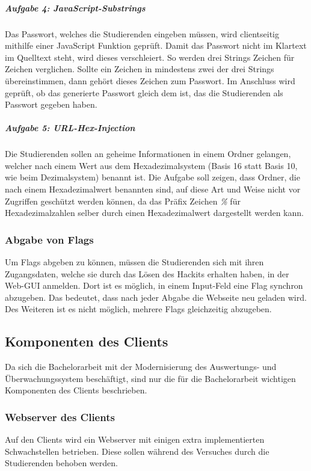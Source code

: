 \subparagraph{Aufgabe 4: JavaScript-Substrings}\label{subpara:Aufgabe_4_JavaScript-Substrings}
Das Passwort, welches die Studierenden eingeben müssen, wird clientseitig mithilfe einer JavaScript Funktion geprüft. Damit das Passwort nicht im Klartext im Quelltext steht, wird dieses verschleiert. So werden drei Strings Zeichen für Zeichen verglichen. Sollte ein Zeichen in mindestens zwei der drei Strings übereinstimmen, dann gehört dieses Zeichen zum Passwort. Im Anschluss wird geprüft, ob das generierte Passwort gleich dem ist, das die Studierenden als Passwort gegeben haben.

\subparagraph{Aufgabe 5: URL-Hex-Injection}\label{subpara:Aufgabe_5_URL-Hex-Injection}
Die Studierenden sollen an geheime Informationen in einem Ordner gelangen, welcher nach einem Wert aus dem Hexadezimalsystem (Basis 16 statt Basis 10, wie beim Dezimalsystem) benannt ist. Die Aufgabe soll zeigen, dass Ordner, die nach einem Hexadezimalwert benannten sind, auf diese Art und Weise nicht vor Zugriffen geschützt werden können, da das Präfix Zeichen \textit{\%} für Hexadezimalzahlen selber durch einen Hexadezimalwert dargestellt werden kann.

\subsubsection{Abgabe von Flags}\label{subsubsec:Abgabe_von_Flags}
Um Flags abgeben zu können, müssen die Studierenden sich mit ihren Zugangsdaten, welche sie durch das Lösen des Hackits erhalten haben, in der Web-GUI anmelden. Dort ist es möglich, in einem Input-Feld eine Flag synchron abzugeben. Das bedeutet, dass nach jeder Abgabe die Webseite neu geladen wird. Des Weiteren ist es nicht möglich, mehrere Flags gleichzeitig abzugeben.

\subsection{Komponenten des Clients}\label{subsec:Komponente_des_Clients}
Da sich die Bachelorarbeit mit der Modernisierung des Auswertungs- und Überwachungssystem beschäftigt, sind nur die für die Bachelorarbeit wichtigen Komponenten des Clients beschrieben.

\subsubsection{Webserver des Clients}\label{subsubsec:Webserver_des_Clients}
Auf den Clients wird ein Webserver mit einigen extra implementierten Schwachstellen betrieben. Diese sollen während des Versuches durch die Studierenden behoben werden.

